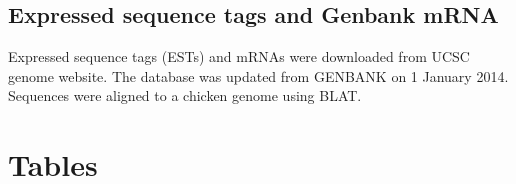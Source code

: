 \documentclass[10pt]{article}
\begin{document}
\subsection*{Expressed sequence tags and Genbank mRNA}
Expressed sequence tags (ESTs) and mRNAs were downloaded from UCSC genome website.
The database was updated from GENBANK on 1 January 2014.
Sequences were aligned to a chicken genome using BLAT.



\section*{Tables}
\end{document}
